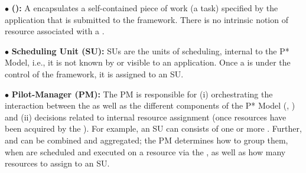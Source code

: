 \documentclass[conference]{IEEEtran}
\begin{document}

\noindent$\bullet$ \textbf{\computeunit  (\cu):} A \cu  encapsulates a 
  self-contained piece of work (a task) specified by the application that is
  submitted to the \pilotjob framework. There is no intrinsic notion
  of resource associated with a \cu.

\noindent$\bullet$ \textbf{Scheduling Unit (SU):} SUs are the units of 
  scheduling, internal to the P* Model, i.e., it is not known by or
  visible to an application. Once a \cu is
  under the control of the \pilotjob framework, it is assigned
  to an SU.

\noindent$\bullet$ \textbf{Pilot-Manager (PM):} The PM is responsible for (i)
  orchestrating the interaction between the \pilots as well as the
  different components of the P* Model (\cus, \sus) and (ii) decisions
  related to internal resource assignment (once resources have been
  acquired by the \pilotjob).  For example, an SU can consists of one
  or more \cus. Further, \cus and \sus can be combined and aggregated;
  the PM determines how to group them, when \sus are scheduled and
  executed on a resource via the \pilot, as well as how many resources
  to assign to an SU.




\end{document}
